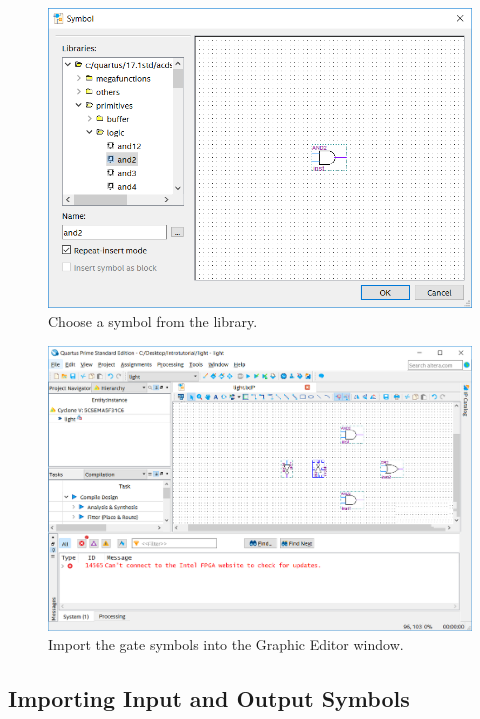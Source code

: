 \documentclass[11pt, twoside, pdftex]{article}
\begin{document}
\begin{figure}[H]
   \begin{center}
      \includegraphics[scale=0.5]{figures/figure15.png}
   \caption{Choose a symbol from the library.} 
	 \label{fig:15}
	 \end{center}
\end{figure}

\begin{figure}[H]
   \begin{center}
      \includegraphics[scale=0.50]{figures/figure16.png}
   \caption{Import the gate symbols into the Graphic Editor window.} 
	 \label{fig:16}
	 \end{center}
\end{figure}

\subsection{Importing Input and Output Symbols}
\end{document}
